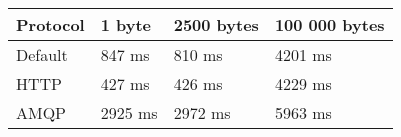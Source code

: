 \begin{tabularx}{\textwidth}{llll}
\hline
 Protocol   & 1 byte   & 2500 bytes   & 100 000 bytes   \\
\hline
 Default    & 847 ms   & 810 ms       & 4201 ms         \\
 HTTP       & 427 ms   & 426 ms       & 4229 ms         \\
 AMQP       & 2925 ms  & 2972 ms      & 5963 ms         \\
\hline
\end{tabularx}